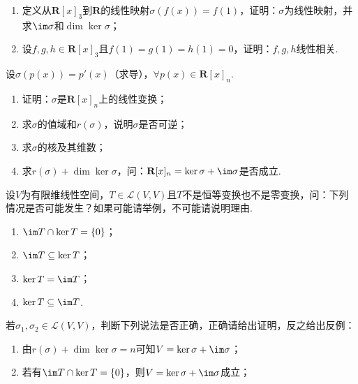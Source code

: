 \begin{exercise}
\begin{exgroup}
\begin{enumerate}
            \item 定义从$\mathbf{R}[x]_3$到$\mathbf{R}$的线性映射$\sigma(f(x))=f(1)$，证明：$\sigma$为线性映射，并求$\im\sigma$和$\dim\ker\sigma$；

            \item 设$f,g,h \in \mathbf{R}[x]_3$且$f(1)=g(1)=h(1)=0$，证明：$f,g,h$线性相关.
        \end{enumerate}

        \item 设$\sigma(p(x))=p'(x)$（求导），$\forall p(x) \in \mathbf{R}[x]_n$.
        \begin{enumerate}
            \item 证明：$\sigma$是$\mathbf{R}[x]_n$上的线性变换；

            \item 求$\sigma$的值域和$r(\sigma)$，说明$\sigma$是否可逆；

            \item 求$\sigma$的核及其维数；

            \item 求$r(\sigma)+\dim\ker\sigma$，问：$\mathbf{R}[x]_n=\ker\sigma+\im \sigma$是否成立.
        \end{enumerate}

        \item 设$V$为有限维线性空间，$T\in \mathcal{L}(V,V)$且$T$不是恒等变换也不是零变换，问：下列情况是否可能发生？如果可能请举例，不可能请说明理由.
        \begin{enumerate}
            \item $\im T \cap \ker T = \{0\}$；

            \item $\im T \subseteq \ker T$；

            \item $\ker T = \im T$；

            \item $\ker T \subseteq \im T$.
        \end{enumerate}

        \item 若$\sigma_1,\sigma_2\in \mathcal{L}(V,V)$，判断下列说法是否正确，正确请给出证明，反之给出反例：
        \begin{enumerate}
            \item 由$r(\sigma)+\dim\ker\sigma=n$可知$V=\ker\sigma+\im \sigma$；

            \item 若有$\im T \cap \ker T = \{0\}$，则$V=\ker\sigma+\im \sigma$成立；


\end{enumerate}
\end{exgroup}
\end{exercise}
